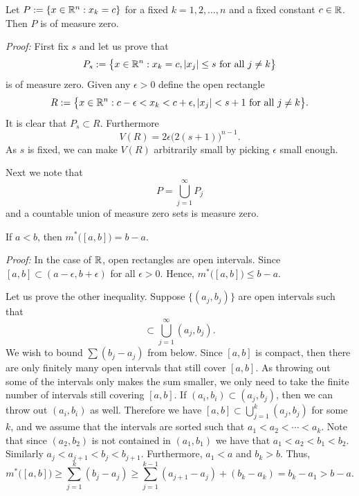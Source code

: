 \begin{example} \label{mv:example:planenull}
Let $P := \{ x \in {\mathbb{R}}^n : x_k = c \}$ for a fixed $k=1,2,\ldots,n$ and
a fixed constant $c \in {\mathbb{R}}$.  Then $P$ is of measure zero.

\emph{Proof:}
First fix $s$ and let us prove that
\begin{equation*}
P_s := \bigl\{ x \in {\mathbb{R}}^n : x_k = c, \lvert {x_j} \rvert \leq s \text{ for all
$j\not=k$} \bigr\}
\end{equation*}
is of measure zero.
Given any $\epsilon > 0$ define the open rectangle
\begin{equation*}
R := \bigl\{ x \in {\mathbb{R}}^n : c-\epsilon < x_k < c+\epsilon, \lvert {x_j} \rvert < s+1
\text{ for all $j\not=k$} \bigr\} .
\end{equation*}
It is clear that $P_s \subset R$.  Furthermore
\begin{equation*}
V(R) = 2\epsilon {\bigl(2(s+1)\bigr)}^{n-1} .
\end{equation*}
As $s$ is fixed, we can
make $V(R)$
arbitrarily small by
picking $\epsilon$ small enough.

Next we note that
\begin{equation*}
P = \bigcup_{j=1}^\infty P_j
\end{equation*}
and a countable union of measure zero sets is measure zero.
\end{example}

\begin{example}
If $a < b$, then $m^*\bigl([a,b]\bigr) = b-a$.

\emph{Proof:}
In the case of ${\mathbb{R}}$, open rectangles are open intervals.
Since $[a,b] \subset (a-\epsilon,b+\epsilon)$ for all $\epsilon > 0$.
Hence, $m^*\bigl([a,b]\bigr) \leq b-a$.

Let us prove the other inequality.
Suppose $\bigl\{ (a_j,b_j) \bigr\}$ are open intervals such that
\begin{equation*}
[a,b] \subset \bigcup_{j=1}^\infty (a_j,b_j) .
\end{equation*}
We wish to bound $\sum (b_j-a_j)$ from below.
Since $[a,b]$ is compact, then there are only finitely many open intervals
that still cover $[a,b]$.  As throwing out some of the intervals only makes the
sum smaller, we only need to take the finite number of intervals
still covering $[a,b]$.
If $(a_i,b_i) \subset (a_j,b_j)$, then we can throw out
$(a_i,b_i)$ as well.
Therefore we have
$[a,b] \subset \bigcup_{j=1}^k (a_j,b_j)$ for some $k$, and
we assume that the intervals are sorted such that $a_1 < a_2 < \cdots <
a_k$.  Note that since $(a_2,b_2)$ is not contained in $(a_1,b_1)$
we have that $a_1 < a_2 < b_1 < b_2$.  Similarly
$a_j < a_{j+1} < b_j < b_{j+1}$.  Furthermore, $a_1 < a$ and $b_k > b$.
Thus,
\begin{equation*}
m^*\bigl([a,b]\bigr) \geq
\sum_{j=1}^k (b_j-a_j)
\geq
\sum_{j=1}^{k-1} (a_{j+1}-a_j)
+
(b_k-a_k)
=
b_k-a_1 > b-a .
\end{equation*}
\end{example}

